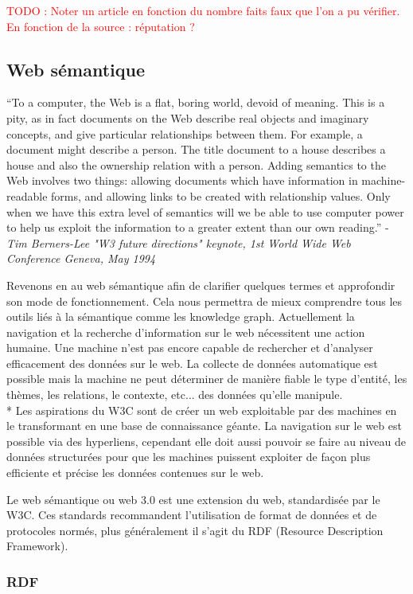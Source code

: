 \documentclass[12pt]{article}
\newcommand\todo[1]{\textcolor{red}{TODO : #1}}
\begin{document}
\todo{Noter un article en fonction du nombre faits faux que l'on a pu vérifier.
En fonction  de la source : réputation ?}

\subsection{Web sémantique}

\enquote{To a computer, the Web is a flat, boring world, devoid of meaning. This is a pity, as in fact documents on the Web describe real objects and imaginary concepts, and give particular relationships between them. For example, a document might describe a person. The title document to a house describes a house and also the ownership relation with a person. Adding semantics to the Web involves two things: allowing documents which have information in machine-readable forms, and allowing links to be created with relationship values. Only when we have this extra level of semantics will we be able to use computer power to help us exploit the information to a greater extent than our own reading.} - \textit{Tim Berners-Lee "W3 future directions" keynote, 1st World Wide Web Conference Geneva, May 1994} \cite{tim}

Revenons en au web sémantique afin de clarifier quelques termes et approfondir son mode de fonctionnement. Cela nous permettra de mieux comprendre tous les outils liés à la sémantique comme les knowledge graph. Actuellement la navigation et la recherche d'information sur le web nécessitent une action humaine. Une machine n'est pas encore capable de rechercher et d'analyser efficacement des données sur le web. La collecte de données automatique est possible mais la machine ne peut déterminer de manière fiable le type d'entité, les thèmes, les relations, le contexte, etc... des données qu'elle manipule.
\\*
Les aspirations du W3C sont de créer un web exploitable par des machines en le transformant en une base de connaissance géante.
La navigation sur le web est possible via des hyperliens, cependant elle doit aussi pouvoir se faire au niveau de données structurées pour que les machines puissent exploiter de façon plus efficiente et précise les données contenues sur le web.

Le web sémantique ou web 3.0 est une extension du web, standardisée par le W3C. Ces standards recommandent l'utilisation de format de données et de protocoles normés, plus généralement il s'agit du RDF (Resource Description Framework).

\subsubsection{RDF}
\end{document}
